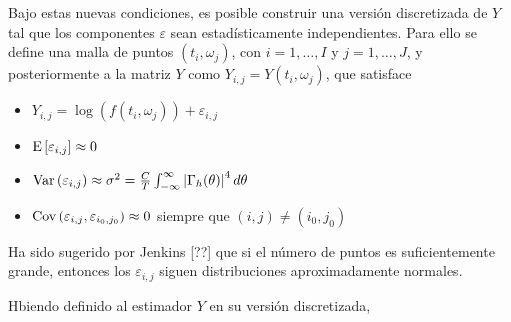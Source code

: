 Bajo estas nuevas condiciones, es posible construir una versión discretizada de $Y$ tal 
que los componentes $\varepsilon$ sean estadísticamente independientes. Para ello se define
una malla de puntos $(t_i,\omega_j)$, con $i = 1,\dots,I$ y  $j=1,\dots,J$, y posteriormente
a la matriz $Y$ como $Y_{i,j} = Y(t_i,\omega_j)$, que satisface
%
\begin{itemize}
\item $Y_{i,j} = \log\left(f(t_i,\omega_j)\right) + \varepsilon_{i,j}$
\item $\mathrm{E}\left[ \varepsilon_{i,j} \right] \approx 0$
\item $\mathrm{Var}\left( \varepsilon_{i,j} \right) \approx \sigma^{2} = 
\frac{C}{T} \int_{-\infty}^{\infty} \left| \Gamma_h(\theta) \right|^{4} d\theta$
\item $\mathrm{Cov}\left( \varepsilon_{i,j},\varepsilon_{i_0,j_0} \right) \approx 0$ siempre que $(i,j)\neq (i_0,j_0)$
\end{itemize}

Ha sido sugerido por Jenkins [??] que si el número de puntos es suficientemente grande, entonces
los $\varepsilon_{i,j}$ siguen distribuciones aproximadamente normales.

Hbiendo definido al estimador $Y$ en su versión discretizada, 


